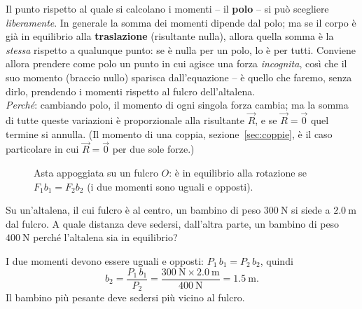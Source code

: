 \begin{remark}
Il punto rispetto al quale si calcolano i momenti -- il \textbf{polo} -- si può scegliere \emph{liberamente}. In generale la somma dei momenti dipende dal polo; ma se il corpo è già in equilibrio alla \textbf{traslazione} (risultante nulla), allora quella somma è la \emph{stessa} rispetto a qualunque punto: se è nulla per un polo, lo è per tutti. Conviene allora prendere come polo un punto in cui agisce una forza \emph{incognita}, così che il suo momento (braccio nullo) sparisca dall'equazione -- è quello che faremo, senza dirlo, prendendo i momenti rispetto al fulcro dell'altalena. \\[2pt]
\emph{Perché}: cambiando polo, il momento di ogni singola forza cambia; ma la somma di tutte queste variazioni è proporzionale alla risultante $\vec R$, e se $\vec R = \vec 0$ quel termine si annulla. (Il momento di una coppia, sezione~\ref{sec:coppie}, è il caso particolare in cui $\vec R = \vec 0$ per due sole forze.)
\end{remark}

\begin{figure}[h!]
\centering
{}
\caption{Asta appoggiata su un fulcro $O$: è in equilibrio alla rotazione se $F_1 b_1 = F_2 b_2$ (i due momenti sono uguali e opposti).}
\label{fig:asta}
\end{figure}

\begin{testexample}
Su un'altalena, il cui fulcro è al centro, un bambino di peso $\SI{300}{\newton}$ si siede a $\SI{2,0}{\meter}$ dal fulcro. A quale distanza deve sedersi, dall'altra parte, un bambino di peso $\SI{400}{\newton}$ perché l'altalena sia in equilibrio?

I due momenti devono essere uguali e opposti: $P_1\,b_1 = P_2\,b_2$, quindi
\[
b_2 = \frac{P_1\,b_1}{P_2} = \frac{\SI{300}{\newton}\times\SI{2,0}{\meter}}{\SI{400}{\newton}} = \SI{1,5}{\meter}.
\]
Il bambino più pesante deve sedersi più vicino al fulcro.
\end{testexample}


